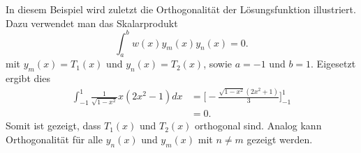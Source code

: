 \begin{beispiel}
	In diesem Beispiel wird zuletzt die Orthogonalität der Lösungsfunktion
	illustriert.
	Dazu verwendet man das Skalarprodukt
	\[
		\int_{a}^{b} w(x) y_m(x) y_n(x) = 0.
	\]
	mit $y_m(x) = T_1(x)$ und $y_n(x) = T_2(x)$, sowie $a=-1$ und $b = 1$.
	Eigesetzt ergibt dies
	\[
	\begin{aligned}
	\int_{-1}^{1} \frac{1}{\sqrt{1-x^2}} x (2x^2-1) dx &=
	\biggl [ - \frac{\sqrt{1-x^2}(2x^2+1)}{3} \biggr ]_{-1}^{1}\\
	&= 0.
	\end{aligned}
	\]
	Somit ist gezeigt, dass $T_1(x)$ und $T_2(x)$ orthogonal sind.
	Analog kann Orthogonalität für alle $y_n(x)$ und $y_m(x)$ mit $n \ne m$ gezeigt werden.
\end{beispiel}

